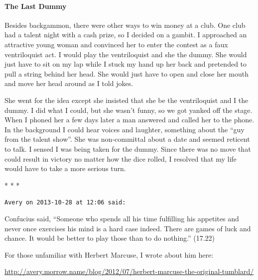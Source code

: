 \paragraph{The Last Dummy}


Besides backgammon, there were other ways to win money at a club. One club had a talent night with a cash prize, so I decided on a gambit. I approached an attractive young woman and convinced her to enter the contest as a faux ventriloquist act. I would play the ventriloquist and she the dummy. She would just have to sit on my lap while I stuck my hand up her back and pretended to pull a string behind her head. She would just have to open and close her mouth and move her head around as I told jokes.

She went for the idea except she insisted that she be the ventriloquist and I the dummy. I did what I could, but she wasn't funny, so we got yanked off the stage. When I phoned her a few days later a man answered and called her to the phone. In the background I could hear voices and laughter, something about the ``guy from the talent show''. She was non-committal about a date and seemed reticent to talk. I sensed I was being taken for the dummy. Since there was no move that could result in victory no matter how the dice rolled, I resolved that my life would have to take a more serious turn.



\begin{center}* * *\end{center}

\begin{footnotesize}
\begin{sffamily}
\texttt{Avery on 2013-10-28 at 12:06 said:}

Confucius said, ``Someone who spends all his time fulfilling his appetites and never once exercises his mind is a hard case indeed. There are games of luck and chance. It would be better to play those than to do nothing.'' (17.22)

For those unfamiliar with Herbert Marcuse, I wrote about him here:

\url{http://avery.morrow.name/blog/2012/07/herbert-marcuse-the-original-tumblard/}


\end{sffamily}
\end{footnotesize}

